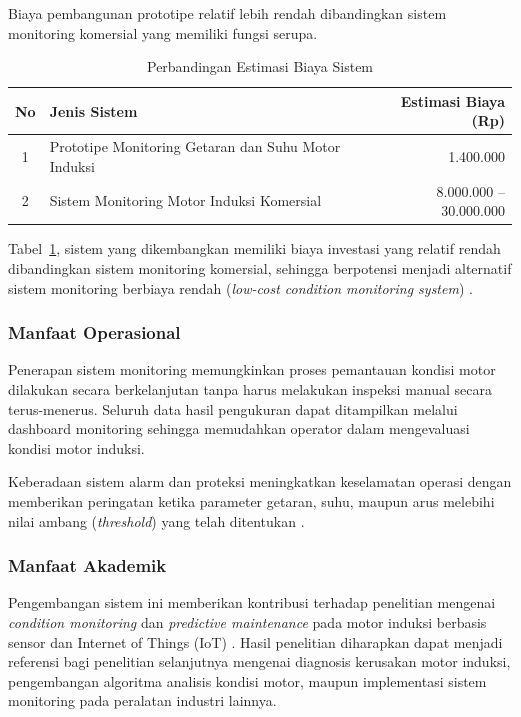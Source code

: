 \documentclass{elsinta}
\begin{document}
Biaya pembangunan prototipe relatif lebih rendah dibandingkan sistem monitoring komersial yang memiliki fungsi serupa.

\begin{table}[H]
\centering
\caption{Perbandingan Estimasi Biaya Sistem}
\label{tab:perbandingan_biaya}
\renewcommand{\arraystretch}{1.3}

\begin{tabular}{|c|p{8cm}|r|}
\hline
\textbf{No} &
\centering\textbf{Jenis Sistem} &
\textbf{Estimasi Biaya (Rp)}\\
\hline

1 &
Prototipe Monitoring Getaran dan Suhu Motor Induksi &
1.400.000\\
\hline

2 &
Sistem Monitoring Motor Induksi Komersial &
8.000.000 -- 30.000.000\\
\hline

\end{tabular}

\end{table}

Tabel~\ref{tab:perbandingan_biaya}, sistem yang dikembangkan memiliki biaya investasi yang relatif rendah dibandingkan sistem monitoring komersial, sehingga berpotensi menjadi alternatif sistem monitoring berbiaya rendah (\textit{low-cost condition monitoring system}) \cite{boardman2018}.

\subsubsection{Manfaat Operasional}

Penerapan sistem monitoring memungkinkan proses pemantauan kondisi motor dilakukan secara berkelanjutan tanpa harus melakukan inspeksi manual secara terus-menerus. Seluruh data hasil pengukuran dapat ditampilkan melalui dashboard monitoring sehingga memudahkan operator dalam mengevaluasi kondisi motor induksi.

Keberadaan sistem alarm dan proteksi meningkatkan keselamatan operasi dengan memberikan peringatan ketika parameter getaran, suhu, maupun arus melebihi nilai ambang (\textit{threshold}) yang telah ditentukan \cite{IEC60034,jardine2006}.

\subsubsection{Manfaat Akademik}

Pengembangan sistem ini memberikan kontribusi terhadap penelitian mengenai \textit{condition monitoring} dan \textit{predictive maintenance} pada motor induksi berbasis sensor dan Internet of Things (IoT) \cite{bahga2014,jardine2006}. Hasil penelitian diharapkan dapat menjadi referensi bagi penelitian selanjutnya mengenai diagnosis kerusakan motor induksi, pengembangan algoritma analisis kondisi motor, maupun implementasi sistem monitoring pada peralatan industri lainnya.
\end{document}
